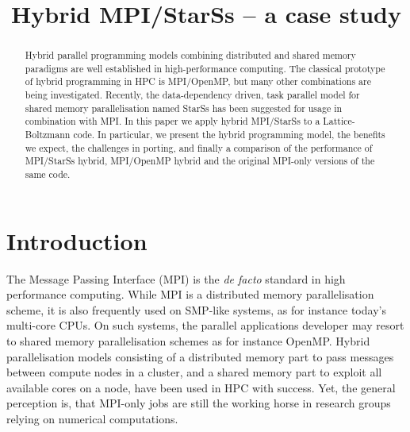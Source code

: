 \documentclass[conference]{IEEEtran}
\newcommand{\starss}{{StarSs}}
\begin{document}
 

\title{Hybrid MPI/\starss{} -- a case study}
\author{
}
\maketitle
\begin{abstract}
  Hybrid parallel programming models combining distributed and shared
  memory paradigms are well established in high-performance
  computing. The classical prototype of hybrid programming in HPC is
  MPI/OpenMP, but many other combinations are being
  investigated. Recently, the data-dependency driven, task parallel model
  for shared memory parallelisation named \starss{} has been suggested
  for usage in combination with MPI. In this paper we apply hybrid
  MPI/\starss{} to a Lattice-Boltzmann code. In particular, we present
  the hybrid programming model, the benefits we expect, the
  challenges in porting, and finally a comparison of the
  performance of MPI/\starss{} hybrid, MPI/OpenMP hybrid
  and the original MPI-only versions of the same code.
\end{abstract}


\section{Introduction}

The Message Passing Interface (MPI) is the \emph{de facto} standard in
high performance computing. While MPI is a distributed memory
parallelisation scheme, it is also frequently used on SMP-like
systems, as for instance today's multi-core CPUs. On such systems,
the parallel applications developer may resort to shared
memory parallelisation schemes as for instance OpenMP. Hybrid
parallelisation models consisting of a distributed memory part to
pass messages between compute nodes in a cluster, and a
shared memory part to exploit all available cores on a node, have been
used in HPC with success.
Yet, the general perception is, that MPI-only jobs
are still the working horse in research groups relying on numerical
computations. 
\end{document}
